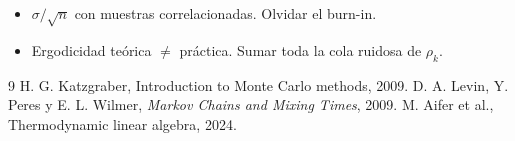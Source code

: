 \documentclass[11pt,a4paper]{article}
\begin{document}
\begin{error}
\begin{itemize}[nosep]
\item $\sigma/\sqrt n$ con muestras correlacionadas. \quad Olvidar el burn-in.
\item Ergodicidad teórica $\neq$ práctica. \quad Sumar toda la cola ruidosa de $\rho_k$.
\end{itemize}
\end{error}

\begin{thebibliography}{9}\small
{} H. G. Katzgraber, Introduction to Monte Carlo methods, 2009.
 D. A. Levin, Y. Peres y E. L. Wilmer, \emph{Markov Chains and Mixing Times}, 2009.
 M. Aifer et al., Thermodynamic linear algebra, 2024.
\end{thebibliography}
\end{document}
